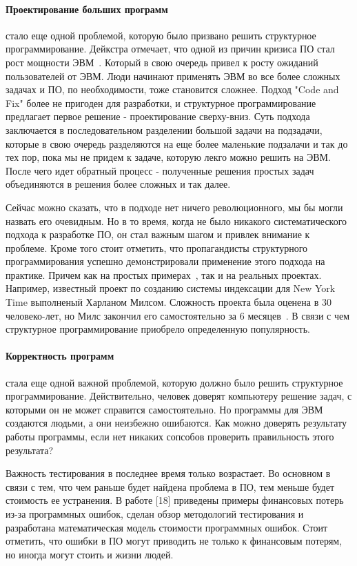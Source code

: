 \paragraph{Проектирование больших программ} стало еще одной проблемой, которую было призвано решить структурное программирование. Дейкстра отмечает, что одной из причин кризиса ПО стал рост мощности ЭВМ~\cite{Dijkstra:1972:HP}. Который в свою очередь привел к росту ожиданий пользователей от ЭВМ. Люди начинают применять ЭВМ во все более сложных задачах и ПО, по необходимости, тоже становится сложнее. Подход "Code and Fix" более не пригоден для разработки, и структурное программирование предлагает первое решение - проектирование сверху-вниз. Суть подхода заключается в последовательном разделении большой задачи на подзадачи, которые в свою очередь разделяются на еще более маленькие подзалачи и так до тех пор, пока мы не придем к задаче, которую лекго можно решить на ЭВМ. После чего идет обратный процесс - полученные решения простых задач объединяются в решения более сложных и так далее.

Сейчас можно сказать, что в подходе нет ничего революционного, мы бы могли назвать его очевидным. Но в то время, когда не было никакого систематического подхода к разработке ПО, он стал важным шагом и привлек внимание к проблеме. Кроме того стоит отметить, что пропагандисты структурного программирования успешно демонстрировали применение этого подхода на практике. Причем как на простых примерах~\cite{Wirth:1971:PDS}, так и на реальных проектах. Например, известный проект по созданию системы индексации для New York Time выполненый Харланом Милсом. Сложность проекта была оценена в 30 человеко-лет, но Милс закончил его самостоятельно за 6 месяцев~\cite{Aron:1979:SP}. В связи с чем структурное программирование приобрело определенную популярность.

\paragraph{Корректность программ} стала еще одной важной проблемой, которую должно было решить структурное программирование. Действительно, человек доверят компьютеру решение задач, с которыми он не может справится самостоятельно. Но программы для ЭВМ создаются людьми, а они неизбежно ошибаются. Как можно доверять результату работы программы, если нет никаких сопсобов проверить правильность этого результата?

Важность тестирования в последнее время только возрастает. Во основном в связи с тем, что чем раньше будет найдена проблема в ПО, тем меньше будет стоимость ее устранения. В работе [18] приведены примеры финансовых потерь из-за программных ошибок, сделан обзор методологий тестирования и разработана математическая модель стоимости программных ошибок. Стоит отметить, что ошибки в ПО могут приводить не только к финансовым потерям, но иногда могут стоить и жизни людей.

